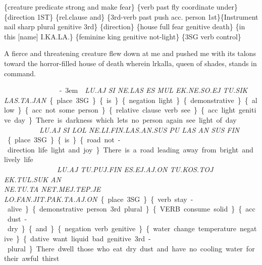 {\{creature predicate strong and make fear\} \{verb past fly coordinate under\} \{direction 1ST\} \{rel.clause and\} \{3rd-verb past push acc. person 1st\}\{Instrument nail sharp plural genitive 3rd\} \{direction\} \{house full fear genitive death\} \{in this [name] I.KA.LA.\} \{feminine king genitive not-light\} \{3SG verb control\} 

A fierce and threatening creature flew down at me and pushed me with its talons toward the horror-filled house of death wherein lrkalla, queen of shades, stands in command.  
 
 
\drie 

\es\aj ~ \si ~ \Atlanne\la ~ \es ~ \mul~\ek\Atlanne\so\ej~\tu\sik~\las\ta\jan\kern-3em\period

{\it LU.AJ SI NE.LAS ES MUL EK.NE.SO.EJ TU.SIK LAS.TA.JAN}

 \{place 3SG\} \{is\} \{negation light\} \{demonstrative\} \{allow\}\{acc. not some person\}\{relative clause verb see\}\{acc. light genitive day\} 

There is darkness which lets no person again see light of day.  

\drie 
 

\lu\aj ~ \si ~ \lol~ \Atlanne\li\fin\las\an\sus ~ \pu ~ \las ~ \an ~ \sus ~ \fin

{\it LU.AJ SI LOL NE.LI.FIN.LAS.AN.SUS PU LAS AN SUS FIN }

\{place 3SG\} \{is\}\{road not-direction life light and joy\} 

There is a road leading away from bright and lively life.  
 
\drie 

\lu\aj ~ \tu\puj\fin ~ \es\ej\aj\on ~  \tu\kos\toj ~ \ek\tul\suk ~ \an \\~ \Atlanne\tu\ta ~ \net\mep\tep\je ~ \lo\fan\jit\pak\ta\aj\on 

{\it LU.AJ TU.PUJ.FIN ES.EJ.AJ.ON  TU.KOS.TOJ EK.TUL.SUK AN \\NE.TU.TA NET.MEJ.TEP.JE LO.FAN.JIT.PAK.TA.AJ.ON}

\{place 3SG\} \{verb stay-alive\} \{demonstrative person 3rd plural\}\{VERB consume solid\}\{acc. dust-dry\} \{and\} \{negation verb genitive\} \{water change temperature negative\} \{dative want liquid bad genitive 3rd-plural\} 

There dwell those who eat dry dust and have no cooling water for their awful thirst.  
 
\drie

\et\ja ~ \ej\am\pa\tu\tuf ~ \et\lu\aj ~ \Atlani\ej\aj\pa\tu\sik \\~ \ek\at\es\ej\aj\on ~  \tu\pa\mot ~ \an ~ \Atlana\ek\tes\on ~ \\ ~  \mi\aj ~ \es\ej\aj ~ \pa\tu\mej\Atlanne\las ~  \\ \Atlanne\tu\ta \ek\jej\fa\an\pop\ta\aj\on 

}
